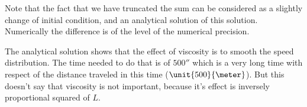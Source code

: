 Note that the fact that we have truncated the sum can be considered as a slightly change of initial condition, and an analytical solution of this solution.
Numerically the difference is of the level of the numerical precision.

The analytical solution shows that the effect of viscosity is to smooth the speed distribution. The time needed to do that is of $\unit{500}{\second}$
which is a very long time with respect of the distance traveled in this time ($\unit{500}{\meter}$).
But this doesn't say that viscosity is not important, because it's effect is inversely proportional squared of $L$.

\HeatSolaa

\HeatSola

\HeatSolb

\HeatSolc

\HeatSold

\HeatSole

\HeatSolf

\HeatSolg

